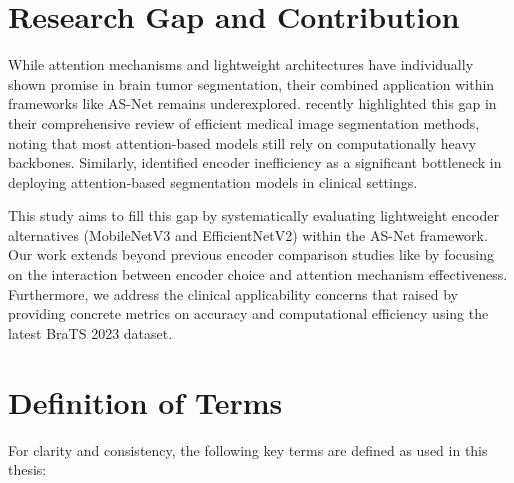 \section{Research Gap and Contribution}

While attention mechanisms and lightweight architectures have individually shown promise in brain tumor segmentation, their combined application within frameworks like AS-Net remains underexplored. \textcite{huang2023efficient} recently highlighted this gap in their comprehensive review of efficient medical image segmentation methods, noting that most attention-based models still rely on computationally heavy backbones. Similarly, \textcite{diagnostics13162670} identified encoder inefficiency as a significant bottleneck in deploying attention-based segmentation models in clinical settings.

This study aims to fill this gap by systematically evaluating lightweight encoder alternatives (MobileNetV3 and EfficientNetV2) within the AS-Net framework. Our work extends beyond previous encoder comparison studies like \textcite{qin2021efficient} by focusing on the interaction between encoder choice and attention mechanism effectiveness. Furthermore, we address the clinical applicability concerns that \textcite{yao2020deeplearning} raised by providing concrete metrics on accuracy and computational efficiency using the latest BraTS 2023 dataset.

\section{Definition of Terms}

For clarity and consistency, the following key terms are defined as used in this thesis:

